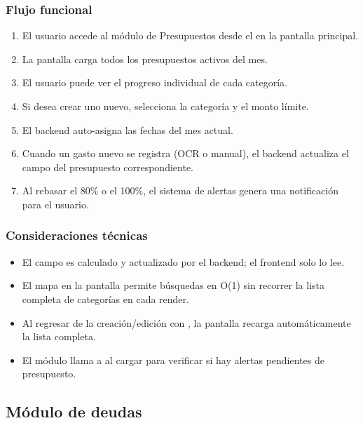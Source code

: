 \subsubsection{Flujo funcional}

\begin{enumerate}
  \item El usuario accede al módulo de Presupuestos desde el
         en la pantalla principal.
  \item La pantalla carga todos los presupuestos activos del mes.
  \item El usuario puede ver el progreso individual de cada categoría.
  \item Si desea crear uno nuevo, selecciona la categoría y el monto
        límite.
  \item El backend auto-asigna las fechas del mes actual.
  \item Cuando un gasto nuevo se registra (OCR o manual), el backend
        actualiza el campo  del presupuesto
        correspondiente.
  \item Al rebasar el 80\% o el 100\%, el sistema de alertas genera una
        notificación para el usuario.
\end{enumerate}

\subsubsection{Consideraciones técnicas}

\begin{itemize}
  \item El campo  es calculado y actualizado por
        el backend; el frontend solo lo lee.
  \item El mapa  en la pantalla permite
        búsquedas en O(1) sin recorrer la lista completa de categorías
        en cada render.
  \item Al regresar de la creación/edición con ,
        la pantalla recarga automáticamente la lista completa.
  \item El módulo llama a
         al cargar para
        verificar si hay alertas pendientes de presupuesto.
\end{itemize}


\subsection{Módulo de deudas}

